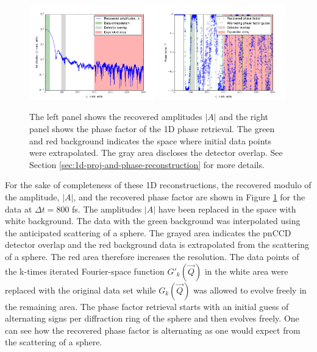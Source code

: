 \begin{figure}
	\centering
		\includegraphics[width=0.49\textwidth]{images/results/amplitude-discussion.png}
		\includegraphics[width=0.49\textwidth]{images/results/phase-discussion.png}
	\caption[Recovered Amplitudes $\lvert A\rvert$ and phase factor of 1D reconstruction]{The left panel shows the recovered amplitudes $\lvert A\rvert$ and the right panel shows the phase factor of the 1D phase retrieval. The green and red background indicates the space where initial data points were extrapolated. The gray area discloses the detector overlap. See Section \ref{sec:1d-proj-and-phase-reconstruction} for more details.}
	\label{fig:amplitude-phase}
\end{figure}
For the sake of completeness of these 1D reconstructions, the recovered modulo of the amplitude, $\lvert A\rvert$, and the recovered phase factor are shown in Figure \ref{fig:amplitude-phase} for the data at $\Delta t =800$ fs. The amplitudes $\lvert A\rvert$ have been replaced in the space with white background. The data with the green background was interpolated using the anticipated scattering of a sphere. The grayed area indicates the pnCCD detector overlap and the red background data is extrapolated from the scattering of a sphere. The red area therefore increases the resolution. The data points of the k-times iterated Fourier-space function $G'_{k}(\vec{Q})$ in the white area were replaced with the original data set while $G_{k}(\vec{Q})$ was allowed to evolve freely in the remaining area. The phase factor retrieval starts with an initial guess of alternating signs per diffraction ring of the sphere and then evolves freely. One can see how the recovered phase factor is alternating as one would expect from the scattering of a sphere.\\[1\baselineskip]
